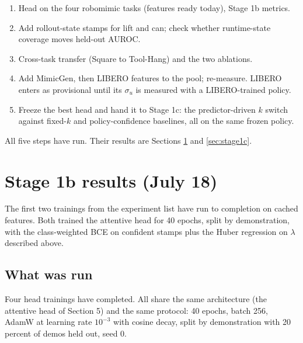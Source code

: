 \documentclass[11pt]{article}
\begin{document}
\begin{enumerate}[leftmargin=2em]
  \item Head on the four robomimic tasks (features ready today), Stage 1b metrics.
  \item Add rollout-state stamps for lift and can; check whether runtime-state
        coverage moves held-out AUROC.
  \item Cross-task transfer (Square to Tool-Hang) and the two ablations.
  \item Add MimicGen, then LIBERO features to the pool; re-measure. LIBERO enters
        as provisional until its $\sigma_u$ is measured with a LIBERO-trained
        policy.
  \item Freeze the best head and hand it to Stage 1c: the predictor-driven $k$
        switch against fixed-$k$ and policy-confidence baselines, all on the same
        frozen policy.
\end{enumerate}

All five steps have run. Their results are Sections \ref{sec:stage1b} and
\ref{sec:stage1c}.

\section{Stage 1b results (July 18)}
\label{sec:stage1b}

The first two trainings from the experiment list have run to completion on cached
features. Both trained the attentive head for 40 epochs, split by demonstration,
with the class-weighted BCE on confident stamps plus the Huber regression on
$\lambda$ described above.

\subsection{What was run}

Four head trainings have completed. All share the same architecture (the attentive
head of Section 5) and the same protocol: 40 epochs, batch 256, AdamW at learning
rate $10^{-3}$ with cosine decay, split by demonstration with 20 percent of demos
held out, seed 0.
\end{document}
